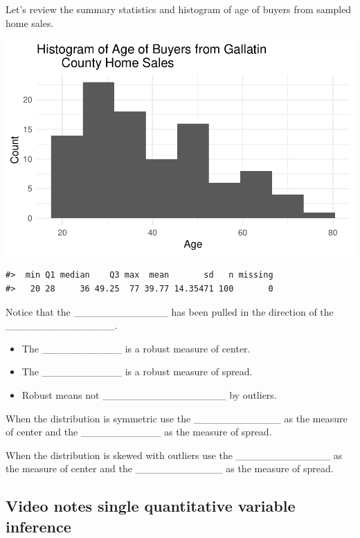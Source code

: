 \documentclass[
]{report}
\begin{document}
Let's review the summary statistics and histogram of age of buyers from sampled home sales.

\begin{center}\includegraphics[width=0.85\linewidth]{06-VN06-EDAonemeanSim_files/figure-latex/unnamed-chunk-8-1} \end{center}

\begin{verbatim}
#>  min Q1 median    Q3 max  mean       sd   n missing
#>   20 28     36 49.25  77 39.77 14.35471 100       0
\end{verbatim}


Notice that the \_\_\_\_\_\_\_\_\_\_\_\_\_ has been pulled in the direction of the \_\_\_\_\_\_\_\_\_\_\_\_\_\_\_.

\begin{itemize}
\item
  The \_\_\_\_\_\_\_\_\_\_\_ is a robust measure of center.
\item
  The \_\_\_\_\_\_\_\_\_\_\_ is a robust measure of spread.
\item
  Robust means not \_\_\_\_\_\_\_\_\_\_\_\_\_\_\_\_\_ by outliers.
\end{itemize}

When the distribution is symmetric use the \_\_\_\_\_\_\_\_\_\_\_\_ as the measure of center and the \_\_\_\_\_\_\_\_\_\_\_ as the measure of spread.

When the distribution is skewed with outliers use the \_\_\_\_\_\_\_\_\_\_\_\_\_ as the measure of center and the \_\_\_\_\_\_\_\_\_\_\_\_ as the measure of spread.


\newpage

\subsection{Video notes single quantitative variable inference}\label{video-notes-single-quantitative-variable-inference}
\end{document}
